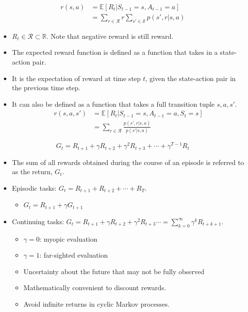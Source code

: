 \begin{definition}
	\begin{align*}
		r(s,a)&= \mathbb{E}[R_t|S_{t-1}=s,A_{t-1}=a]\\
		&= \sum_{r\in \mathcal{R}}r\sum_{s'\in \mathcal{S}}p(s',r|s,a)
	\end{align*}
\end{definition}
\begin{itemize}
	\item $R_t\in \mathcal{R} \subset \mathbb{R}.$ Note that negative reward is still reward.
	\item The expected reward function is defined as a function that takes in a state-action pair.
	\item It is the expectation of reward at time step $t$, given the state-action pair in the previous time step.
	\item It can also be defined as a function that takes a full transition tuple $s,a,s'$.
		\begin{align*}
			r(s,a,s')&= \mathbb{E}[R_t|S_{t-1}=s,A_{t-1}=a,S_{t}=s]\\
			&= \sum_{r\in \mathcal{R}}\frac{p(s',r|s,a)}{p(s'|s,a)}
		\end{align*}
\end{itemize}




\begin{definition}
	$$G_t = R_{t+1}+\gamma R_{t+2}+\gamma^2 R_{t+3}+\cdots+\gamma^{T-1} R_{t} $$
\end{definition}

\begin{itemize}
	\item The sum of all rewards obtained during the course of an episode is referred to as the return, $G_t$.
	\item Episodic tasks: $G_t = R_{t+1} + R_{t+2} + \cdots + R_{T}.$
		\begin{itemize}
			\item $G_t = R_{t+1}+\gamma G_{t+1}$
		\end{itemize}
	\item Continuing tasks: $G_t = R_{t+1} + \gamma R_{t+2} +  \gamma^2 R_{t+3} \cdots =\sum_{k=0}^{\infty} \gamma^{k} R_{t+k+1}.$
		\begin{itemize}
			\item $\gamma=0$: myopic evaluation
			\item $\gamma=1$: far-sighted evaluation
			\item Uncertainty about the future that may not be fully observed
			\item Mathematically convenient to discount rewards. 
			\item Avoid infinite returns in cyclic Markov processes.
		\end{itemize}
\end{itemize}


